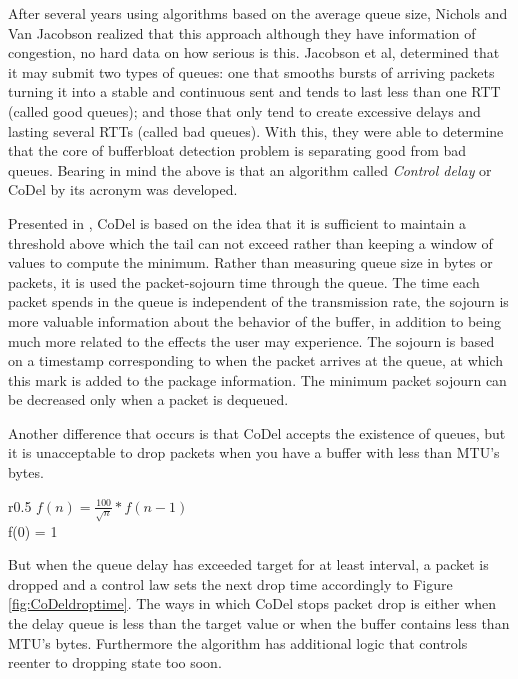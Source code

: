After several years using algorithms based on the average queue size, Nichols
and Van Jacobson realized that this approach although they have information of
congestion, no hard data on how serious is this. Jacobson et al, determined
that it may submit two types of queues: one that smooths bursts of arriving
packets turning it into a stable and continuous sent and tends to last less
than one RTT (called good queues); and those that only tend to create
excessive delays and lasting several RTTs (called bad queues). With this, they
were able to determine that the core of bufferbloat detection problem is
separating good from bad queues. Bearing in mind the above is that an
algorithm called \textit{Control delay} or CoDel by its acronym was
developed.

Presented in \cite{NicholsJacobsonCQD}, CoDel is based on the idea that it is
sufficient to maintain a threshold above which the tail can not exceed rather
than keeping a window of values to compute the minimum. Rather than measuring
queue size in bytes or packets, it is used the packet-sojourn time through the
queue. The time each packet spends in the queue is independent of the
transmission rate, the \gls{sojourn} is more valuable information about the behavior
of the buffer, in addition to being much more related to the effects the user may
experience. The sojourn is based on a timestamp corresponding to when the
packet arrives at the queue, at which this mark is added to the package
information. The minimum packet sojourn can be decreased only when a packet is
dequeued.

Another difference that occurs is that CoDel accepts the existence of queues,
but it is unacceptable to drop packets when you have a buffer with less than
\gls{MTU}'s bytes.

\begin{wrapfigure}{r}{0.5\textwidth}
    \centering
	$f(n) = \frac{100}{\sqrt{n}}*f(n-1)$ \\
	f(0) = 1
    \caption[CoDel droptime interval]{CoDel droptime interval, n=iteration}
    \label{fig:CoDeldroptime}
\end{wrapfigure}

But when the queue delay has exceeded target for at least interval, a packet
is dropped and a control law sets the next drop time accordingly to Figure
\ref{fig:CoDeldroptime}. The ways in which CoDel stops packet drop is either
when the delay queue is less than the target value or when the buffer contains
less than MTU's bytes. Furthermore the algorithm has additional logic that
controls reenter to dropping state too soon.



